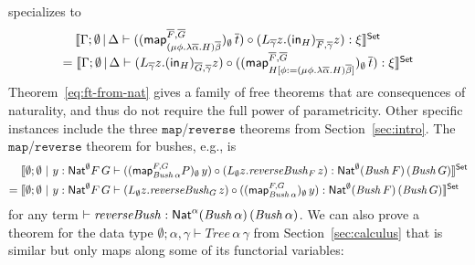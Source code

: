 \documentclass{lmcs}
\theoremstyle{plain}\newtheorem{satz}[thm]{Satz}
\newcommand{\map}{\mathsf{map}}
\begin{document}
specializes to
\begin{equation}\label{thm:subst}
\begin{array}{l}
\hspace*{0.135in}\setsem{\Gamma; \emptyset \,|\, \Delta \vdash
((\map_{(\mu \phi. \lambda
    \overline{\alpha}. H) \overline{\beta}}^{\overline{F},
    \overline{G}})_\emptyset\, \overline{t}) \circ (L_{\overline{\gamma}} z.
  (\tin_{H})_{\overline{F},
    \overline{\gamma}} z) : \xi}\\
= \setsem{\Gamma; \emptyset \,|\, \Delta
\vdash (L_{\overline{\gamma}} z. (\tin_H)_{\overline{G},
  \overline{\gamma}} z) \circ
  ((\map_{H[\phi := (\mu \phi. \lambda \overline{\alpha}. H)
      \overline{\beta}]}^{\overline{F},
    \overline{G}})_\emptyset\, \overline{t})
  : \xi}
\end{array}
\end{equation}
\noindent
Theorem~\ref{eq:ft-from-nat} gives a family of free theorems that are
consequences of naturality, and thus do not require the full power of
parametricity. Other specific instances include the three
$\mathtt{map}$/$\mathtt{reverse}$ theorems from
Section~\ref{sec:intro}. The $\mathtt{map}$/$\mathtt{reverse}$ theorem
for bushes, e.g., is
\begin{align*}
  &\setsem{\emptyset; \emptyset~|~ y : \Nat^\emptyset F \, G
    \vdash ((\map_{\mathit{Bush}\,\alpha}^{{F},
      {G}}P)_\emptyset\, y) \circ (L_{{\emptyset}}
    z. \mathit{reverseBush}_{F}\, z) : \Nat^{{\emptyset}}
    (\mathit{Bush} \, F) \, (\mathit{Bush} \, G) }\\ =\;
  &\setsem{\emptyset; \emptyset~|~ y : \Nat^\emptyset F\, G
    \vdash (L_{\emptyset} z. \mathit{reverseBush}_{G}\,z) \circ
    ((\map_{\mathit{Bush} \, \alpha}^{F, G})_\emptyset\,
           {y}) : \Nat^{\emptyset} (\mathit{Bush} \, F ) \,
           (\mathit{Bush} \, G)}
\end{align*}
for any term $\vdash \mathit{reverseBush} : \mathsf{Nat}^\alpha (\mathit{Bush}
\,\alpha) \, (\mathit{Bush} \, \alpha)$. We can also prove a theorem
for the data type $\emptyset;\alpha,\gamma \vdash
\mathit{Tree}\,\alpha\,\gamma$ from Section~\ref{sec:calculus} that is
similar but only maps along some of its functorial variables:
\end{document}
